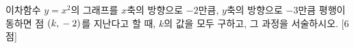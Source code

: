 이차함수 $y=x^2$의 그래프를 $x$축의 방향으로 $-2$만큼, $y$축의 방향으로 $-3$만큼 평행이동하면 점 $(k{,}\mkern3mu -2)$를 지난다고 할 때, $k$의 값을 모두 구하고, 그 과정을 서술하시오. \mbox{[6점]}
